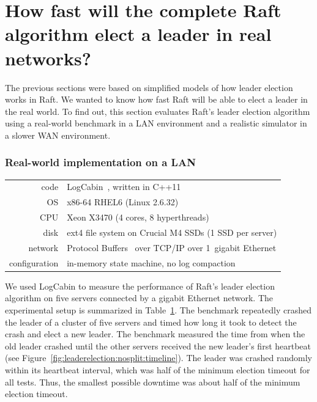 \section{How fast will the complete Raft algorithm elect a leader in
real networks?}
\label{leaderelection:lan}


The previous sections were based on simplified models of how leader
election works in Raft. We wanted to know how fast Raft will be able to
elect a leader in the real world. To find out, this section evaluates
Raft's leader election algorithm using a real-world benchmark in a LAN
environment and a realistic simulator in a slower WAN environment.

\subsubsection{Real-world implementation on a LAN}

\begin{table}
\centering
\begin{tabular}{r l}
code & LogCabin~\cite{logcabin}, written in C++11 \\
OS & x86-64 RHEL6 (Linux 2.6.32) \\
CPU & Xeon X3470 (4 cores, 8 hyperthreads) \\
disk & ext4 file system on Crucial M4 SSDs (1 SSD per server) \\
network & Protocol Buffers~\cite{Varda:2008} over TCP/IP over 1~gigabit Ethernet \\
configuration & in-memory state machine, no log compaction \\
\end{tabular}
\label{tab:leaderelection:benchmarksetup}
\end{table}

We used LogCabin to measure the performance of Raft's
leader election algorithm on five servers connected by a gigabit Ethernet network.
The experimental setup is summarized in
Table~\ref{tab:leaderelection:benchmarksetup}. The benchmark repeatedly
crashed the leader of a cluster of five servers and timed how long it
took to detect the crash and elect a new leader. The benchmark measured
the time from when the old leader crashed until the other servers
received the new leader's first heartbeat (see
Figure~\ref{fig:leaderelection:nosplit:timeline}). The leader was crashed
randomly within its heartbeat interval, which was half of the
minimum election timeout for all tests. Thus, the smallest possible
downtime was about half of the minimum election timeout.

